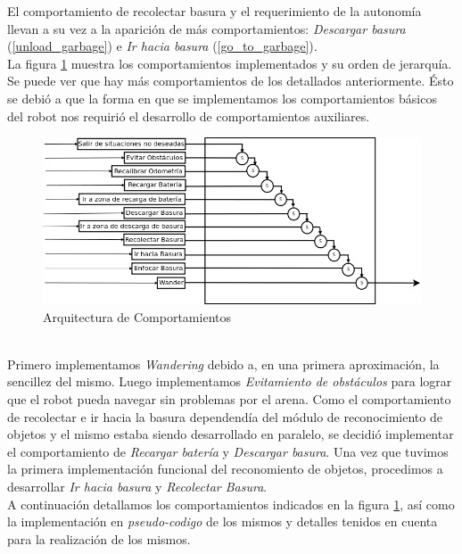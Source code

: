 El comportamiento de recolectar basura y el requerimiento de la autonom\'ia llevan a su vez
a la aparici\'on de m\'as comportamientos: \emph{Descargar basura} (\ref{unload_garbage})
e \emph{Ir hacia basura} (\ref{go_to_garbage}).
\\
La figura \ref{fig:architecture} muestra los comportamientos implementados y su orden de jerarqu\'ia.
Se puede ver que hay m\'as comportamientos de los detallados anteriormente. \'Esto se debi\'o a que la forma
en que se implementamos los comportamientos b\'asicos del robot nos requiri\'o el desarrollo
de comportamientos auxiliares.
\\
\begin{figure}[htp]
\begin{center}
\includegraphics[scale=0.5]{comportamientos/behavioursArchitecture2.png}
\caption{Arquitectura de Comportamientos}
\label{fig:architecture}
\end{center}
\end{figure}
\\
Primero implementamos \emph{Wandering} debido a, en una primera aproximaci\'on, la sencillez
del mismo. Luego implementamos \emph{Evitamiento de obst\'aculos} para lograr que el robot pueda
navegar sin problemas por el arena. Como el comportamiento de recolectar e ir hacia la basura
dependend\'ia del m\'odulo de reconocimiento de objetos y el mismo estaba siendo desarrollado
en paralelo, se decidi\'o implementar el comportamiento de \emph{Recargar bater\'ia} y \emph{Descargar basura}.
Una vez que tuvimos la primera implementaci\'on funcional del reconomiento de objetos, procedimos a
desarrollar \emph{Ir hacia basura} y \emph{Recolectar Basura}.
\\
A continuaci\'on detallamos los comportamientos indicados en la figura \ref{fig:architecture},
as\'i como la implementaci\'on en \textit{pseudo-codigo} de los mismos y detalles tenidos
en cuenta para la realizaci\'on de los mismos.

